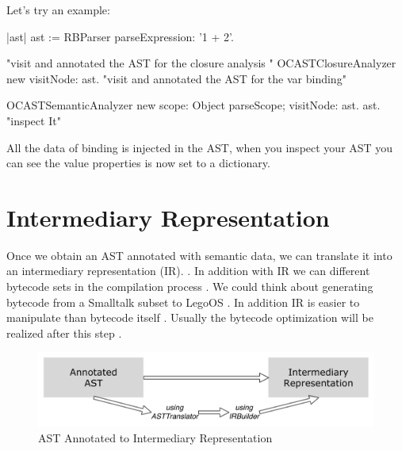 \documentclass[a4paper,10pt,twoside]{book}
\begin{document}
Let's try an example:

\begin{code}{}
|ast|
ast := RBParser parseExpression: '1 + 2'.

"visit and annotated the AST for the closure analysis "
OCASTClosureAnalyzer new visitNode: ast.
"visit and annotated the AST for the var binding"

OCASTSemanticAnalyzer new
		scope: Object parseScope;
		visitNode: ast.
ast. "inspect It"
\end{code}



All the data of binding is injected in the AST, when you inspect your AST you can see the value properties is now 
set to a dictionary. 





\section{Intermediary Representation}


Once we obtain an AST annotated with semantic data, we can translate it into an intermediary representation (IR).  . In addition\ins{,} with IR we can  different bytecode sets in the compilation process . We could think about generating bytecode from a Smalltalk subset to LegoOS . In addition IR is easier to manipulate  than bytecode itself .
 Usually the bytecode optimization will be realized after this step .
 
\begin{figure}[ht]\centering
	\includegraphics[width=\linewidth]{AnnotatedASTToIR}
	\caption{AST Annotated to Intermediary Representation  }
\end{figure}
\end{document}
